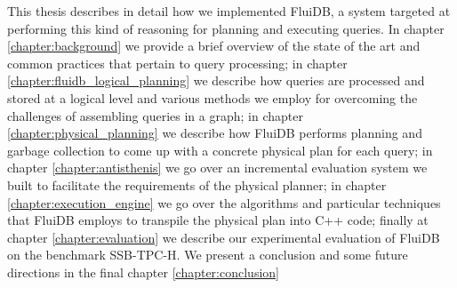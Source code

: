 This thesis describes in detail how we implemented FluiDB, a system
targeted at performing this kind of reasoning for planning and
executing queries. In chapter \ref{chapter:background} we provide a
brief overview of the state of the art and common practices that
pertain to query processing; in chapter
\ref{chapter:fluidb_logical_planning} we describe how queries are
processed and stored at a logical level and various methods we employ for
overcoming the challenges of assembling queries in a graph; in chapter
\ref{chapter:physical_planning} we describe how FluiDB performs
planning and garbage collection to come up with a concrete physical
plan for each query; in chapter \ref{chapter:antisthenis} we go over
an incremental evaluation system we built to facilitate the
requirements of the physical planner; in chapter
\ref{chapter:execution_engine} we go over the algorithms and
particular techniques that FluiDB employs to transpile the physical
plan into C++ code; finally at chapter \ref{chapter:evaluation} we
describe our experimental evaluation of FluiDB on the benchmark
SSB-TPC-H. We present a conclusion and some future directions in the
final chapter \ref{chapter:conclusion}
